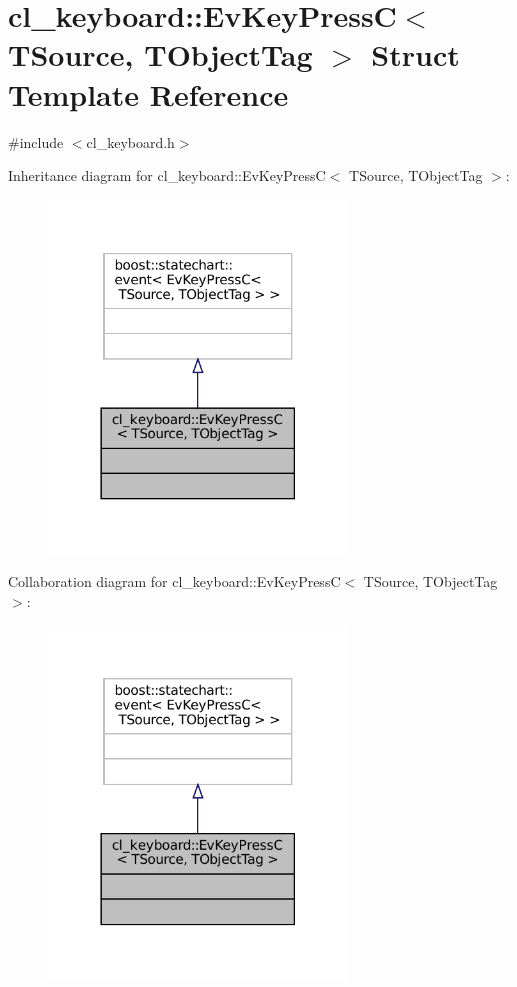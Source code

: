 \hypertarget{structcl__keyboard_1_1EvKeyPressC}{}\section{cl\+\_\+keyboard\+:\+:Ev\+Key\+PressC$<$ T\+Source, T\+Object\+Tag $>$ Struct Template Reference}
\label{structcl__keyboard_1_1EvKeyPressC}


{\ttfamily \#include $<$cl\+\_\+keyboard.\+h$>$}



Inheritance diagram for cl\+\_\+keyboard\+:\+:Ev\+Key\+PressC$<$ T\+Source, T\+Object\+Tag $>$\+:
\nopagebreak
\begin{figure}[H]
\begin{center}
\leavevmode
\includegraphics[width=225pt]{structcl__keyboard_1_1EvKeyPressC__inherit__graph}
\end{center}
\end{figure}


Collaboration diagram for cl\+\_\+keyboard\+:\+:Ev\+Key\+PressC$<$ T\+Source, T\+Object\+Tag $>$\+:
\nopagebreak
\begin{figure}[H]
\begin{center}
\leavevmode
\includegraphics[width=225pt]{structcl__keyboard_1_1EvKeyPressC__coll__graph}
\end{center}
\end{figure}


